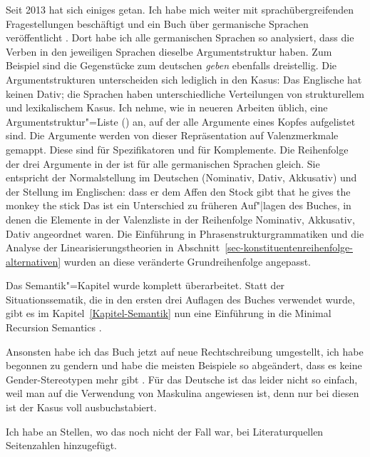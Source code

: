 Seit 2013 hat sich einiges getan. Ich habe mich weiter mit sprachübergreifenden Fragestellungen
beschäftigt und ein Buch über germanische Sprachen veröffentlicht \citep{MuellerGermanic}. Dort habe
ich alle germanischen Sprachen so analysiert, dass die Verben in den jeweiligen Sprachen dieselbe
Argumentstruktur haben. Zum Beispiel sind die Gegenstücke zum deutschen \emph{geben} ebenfalls
dreistellig. Die Argumentstrukturen unterscheiden sich lediglich in den Kasus: Das Englische hat keinen
Dativ; die Sprachen haben unterschiedliche Verteilungen von strukturellem und lexikalischem
Kasus. Ich nehme, wie in neueren Arbeiten üblich, eine Argumentstruktur"=Liste (\argst) an, auf der 
alle Argumente eines Kopfes aufgelistet sind. Die Argumente werden von dieser Repräsentation auf
Valenzmerkmale gemappt. Diese sind \spr für Spezifikatoren und \comps für Komplemente. Die
Reihenfolge der drei Argumente in der \argst ist für alle germanischen Sprachen gleich. Sie
entspricht der Normalstellung im Deutschen (Nominativ, Dativ, Akkusativ) und der Stellung im
Englischen:
\eal
\ex dass er dem Affen den Stock gibt
\ex that he gives the monkey the stick
\zl
Das ist ein Unterschied zu früheren Auf"|lagen des Buches, in denen die Elemente in der Valenzliste
\subcat in der Reihenfolge Nominativ, Akkusativ, Dativ angeordnet waren. Die Einführung in
Phrasenstrukturgrammatiken und die Analyse der Linearisierungstheorien in Abschnitt~\ref{sec-konstituentenreihenfolge-alternativen} wurden an
diese veränderte Grundreihenfolge angepasst.

Das Semantik"=Kapitel wurde komplett überarbeitet. Statt der Situationssematik, die in den ersten
drei Auf\/lagen des Buches verwendet wurde, gibt es im Kapitel~\ref{Kapitel-Semantik} nun eine
Einführung in die Minimal Recursion Semantics \citep*{CFPS2005a}.

Ansonsten habe ich das Buch jetzt auf neue Rechtschreibung umgestellt, ich habe begonnen zu gendern
und habe die meisten Beispiele so abgeändert, dass es keine Gender-Stereotypen mehr gibt
\citep{MB97a,PCKSDMC2017a}. Für das Deutsche ist das leider nicht so einfach, weil man auf die
Verwendung von Maskulina angewiesen ist, denn nur bei diesen ist der Kasus voll ausbuchstabiert. 

Ich habe an Stellen, wo das noch nicht der Fall war, bei Literaturquellen Seitenzahlen hinzugefügt.


